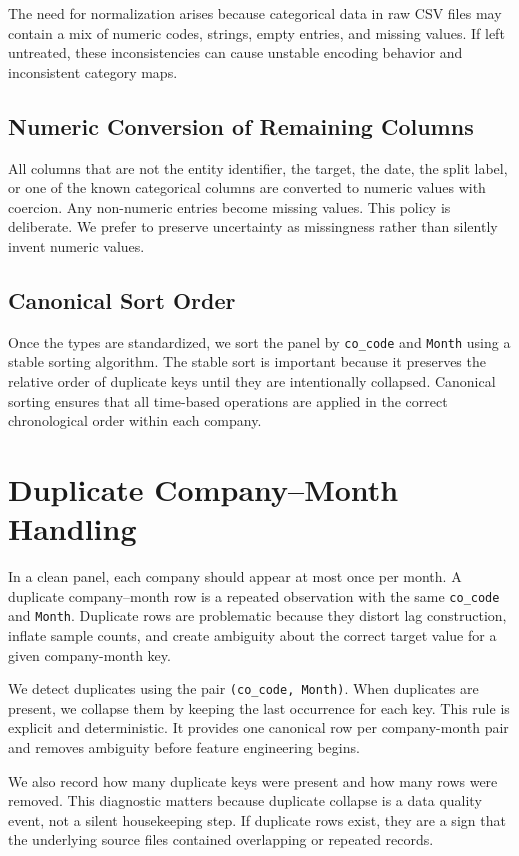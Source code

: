\documentclass[11pt]{article}
\begin{document}
The need for normalization arises because categorical data in raw CSV files may contain a mix of numeric codes, strings, empty entries, and missing values. If left untreated, these inconsistencies can cause unstable encoding behavior and inconsistent category maps.

\subsection{Numeric Conversion of Remaining Columns}

All columns that are not the entity identifier, the target, the date, the split label, or one of the known categorical columns are converted to numeric values with coercion. Any non-numeric entries become missing values. This policy is deliberate. We prefer to preserve uncertainty as missingness rather than silently invent numeric values.

\subsection{Canonical Sort Order}

Once the types are standardized, we sort the panel by \texttt{co\_code} and \texttt{Month} using a stable sorting algorithm. The stable sort is important because it preserves the relative order of duplicate keys until they are intentionally collapsed. Canonical sorting ensures that all time-based operations are applied in the correct chronological order within each company.

\section{Duplicate Company--Month Handling}

In a clean panel, each company should appear at most once per month. A duplicate company--month row is a repeated observation with the same \texttt{co\_code} and \texttt{Month}. Duplicate rows are problematic because they distort lag construction, inflate sample counts, and create ambiguity about the correct target value for a given company-month key.

We detect duplicates using the pair \texttt{(co\_code, Month)}. When duplicates are present, we collapse them by keeping the last occurrence for each key. This rule is explicit and deterministic. It provides one canonical row per company-month pair and removes ambiguity before feature engineering begins.

We also record how many duplicate keys were present and how many rows were removed. This diagnostic matters because duplicate collapse is a data quality event, not a silent housekeeping step. If duplicate rows exist, they are a sign that the underlying source files contained overlapping or repeated records.
\end{document}
